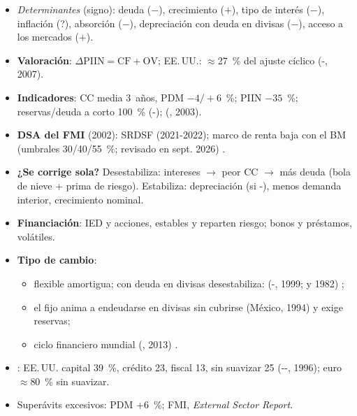 \documentclass{article}
\begin{document}
\begin{columnas}
\begin{itemize}
\item \emph{Determinantes} (signo): deuda ($-$), crecimiento ($+$), tipo de interés ($-$), inflación (?), absorción ($-$), depreciación con deuda en divisas ($-$), acceso a los mercados ($+$).
\end{itemize}
\begin{itemize}
\item \textbf{Valoración}: $\Delta\mathrm{PIIN}=\mathrm{CF}+\mathrm{OV}$; EE.\,UU.: $\approx$27~\% del ajuste cíclico (-, 2007).
\item \textbf{Indicadores}: CC media 3~años, PDM $-4/+6$~\%; PIIN $-35$~\%; reservas/deuda a corto 100~\% (-);  (, 2003).
\item \textbf{DSA del FMI} (2002): SRDSF (2021-2022); marco de renta baja con el BM (umbrales 30/40/55~\%; revisado en sept. 2026) .
\item \textbf{¿Se corrige sola?} Desestabiliza: intereses $\to$ peor CC $\to$ más deuda (bola de nieve + prima de riesgo). Estabiliza: depreciación (si -), menos demanda interior, crecimiento nominal.
\item \textbf{Financiación}: IED y acciones, estables y reparten riesgo; bonos y préstamos, volátiles.
\item \textbf{Tipo de cambio}:
  \begin{itemize}
  \item flexible amortigua; con deuda en divisas desestabiliza:  (-, 1999;  y 1982) ;
  \item el fijo anima a endeudarse en divisas sin cubrirse (México, 1994) y exige reservas;
  \item ciclo financiero mundial (, 2013) .
  \end{itemize}
\item {}: EE.\,UU. capital 39~\%, crédito 23, fiscal 13, sin suavizar 25 (--, 1996); euro $\approx$80~\% sin suavizar.
\item Superávits excesivos: PDM +6~\%; FMI, \emph{External Sector Report}.
\end{itemize}
\begin{itemize}

\end{itemize}
\end{columnas}
\end{document}
